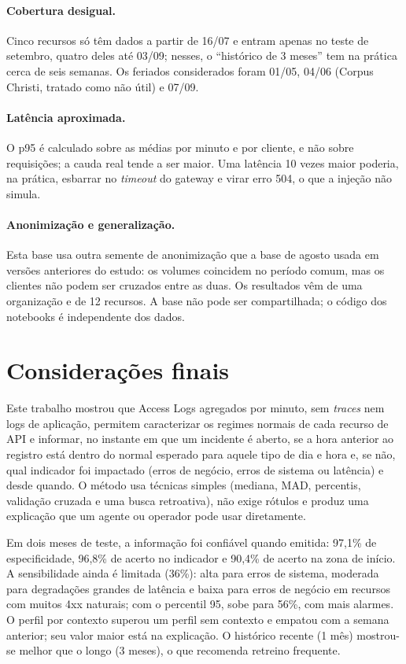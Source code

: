 \documentclass[sigconf,nonacm]{acmart}
\begin{document}
\paragraph{Cobertura desigual.} Cinco recursos só têm dados a partir de 16/07 e entram apenas no teste de setembro, quatro deles até 03/09; nesses, o ``histórico de 3 meses'' tem na prática cerca de seis semanas. Os feriados considerados foram 01/05, 04/06 (Corpus Christi, tratado como não útil) e 07/09.

\paragraph{Latência aproximada.} O p95 é calculado sobre as médias por minuto e por cliente, e não sobre requisições; a cauda real tende a ser maior. Uma latência 10 vezes maior poderia, na prática, esbarrar no \emph{timeout} do gateway e virar erro 504, o que a injeção não simula.

\paragraph{Anonimização e generalização.} Esta base usa outra semente de anonimização que a base de agosto usada em versões anteriores do estudo: os volumes coincidem no período comum, mas os clientes não podem ser cruzados entre as duas. Os resultados vêm de uma organização e de 12 recursos. A base não pode ser compartilhada; o código dos notebooks é independente dos dados.

\section{Considerações finais}\label{sec:conclusao}

Este trabalho mostrou que Access Logs agregados por minuto, sem \emph{traces} nem logs de aplicação, permitem caracterizar os regimes normais de cada recurso de API e informar, no instante em que um incidente é aberto, se a hora anterior ao registro está dentro do normal esperado para aquele tipo de dia e hora e, se não, qual indicador foi impactado (erros de negócio, erros de sistema ou latência) e desde quando. O método usa técnicas simples (mediana, MAD, percentis, validação cruzada e uma busca retroativa), não exige rótulos e produz uma explicação que um agente ou operador pode usar diretamente.

Em dois meses de teste, a informação foi confiável quando emitida: 97,1\% de especificidade, 96,8\% de acerto no indicador e 90,4\% de acerto na zona de início. A sensibilidade ainda é limitada (36\%): alta para erros de sistema, moderada para degradações grandes de latência e baixa para erros de negócio em recursos com muitos 4xx naturais; com o percentil 95, sobe para 56\%, com mais alarmes. O perfil por contexto superou um perfil sem contexto e empatou com a semana anterior; seu valor maior está na explicação. O histórico recente (1 mês) mostrou-se melhor que o longo (3 meses), o que recomenda retreino frequente.
\end{document}
